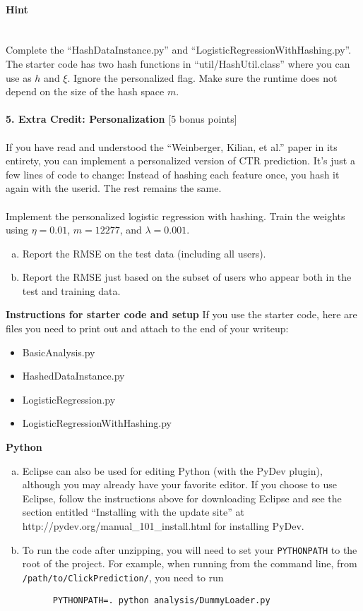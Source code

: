 \documentclass[12pt]{article}
\begin{document}
{\paragraph{Hint} ~\\
Complete the ``HashDataInstance.py'' and ``LogisticRegressionWithHashing.py''. The starter code has two hash functions in ``util/HashUtil.class'' where you can use as $h$ and $\xi$.
Ignore the personalized flag. Make sure the runtime does not depend on the size of the hash space $m$.
\\
\\{\bf 5. Extra Credit: Personalization} [5 bonus points]
\\
\\If you have read and understood the ``Weinberger, Kilian, et al.'' paper in its entirety, you can implement a personalized version of CTR prediction.  It's just a few lines of code to change: Instead of hashing each feature once, you hash it again with the userid. The rest remains the same. 
\\
\\Implement the personalized logistic regression with hashing. Train the weights using $\eta = 0.01$, $m = 12277$, and $\lambda = 0.001$.
\begin{enumerate}[(a)]
	\item Report the RMSE on the test data (including all users).
	\item Report the RMSE just based on the subset of users who appear both in the test and training data.
\end{enumerate}

}

\pagebreak
{\bf Instructions for starter code and setup}
\label{sec:code_instruction}
If you use the starter code, here are files you need to print out and attach to the end of your writeup:
\begin{itemize}
  \item BasicAnalysis.py
  \item HashedDataInstance.py
  \item LogisticRegression.py
  \item LogisticRegressionWithHashing.py
\end{itemize}


{\bf Python}
\begin{enumerate}[(a)]
  \item Eclipse can also be used for editing Python (with the PyDev plugin), although you may already have your favorite editor. If you choose to use Eclipse, follow the instructions above for downloading Eclipse and see the section entitled ``Installing with the update site'' at http://pydev.org/manual\_101\_install.html for installing PyDev.
  \item To run the code after unzipping, you will need to set your \texttt{PYTHONPATH} to the root of the project. For example, when running from the command line, from \texttt{/path/to/ClickPrediction/}, you need to run
    \begin{verbatim}
      PYTHONPATH=. python analysis/DummyLoader.py
    \end{verbatim}
\end{enumerate}
\end{document}
